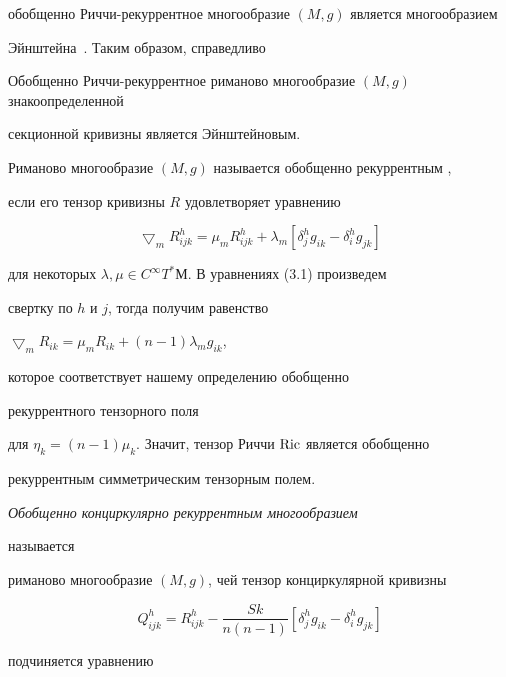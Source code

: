 обобщенно Риччи-рекуррентное многообразие $(M,g)$ является многообразием


Эйнштейна~\cite{tr5}. Таким образом, справедливо 





\begin{cor}


Обобщенно Риччи-рекуррентное риманово многообразие $(M,g)$ знакоопределенной


секционной кривизны является Эйнштейновым.


\end{cor}





Риманово многообразие $(M,g)$ называется обобщенно рекуррентным \cite{tr1},


если его тензор кривизны $R$ удовлетворяет уравнению


\begin{equation}


\bigtriangledown_m R^h_{ijk}=\mu_m R^h_{ijk}+


\lambda_m[\delta ^h_j g_{ik}-\delta^h_i g_{jk}]


\end{equation}


для некоторых $\lambda,\mu\in C^\infty T^* М$. В уравнениях (3.1) произведем


свертку по $h$ и $j$, тогда получим равенство


$\bigtriangledown_m R_{ik}=\mu_m R_{ik}+(n-1)\lambda_m g_{ik}$,


которое соответствует нашему определению обобщенно


рекуррентного тензорного поля


для $\eta_k=(n-1)\mu_k$. Значит, тензор Риччи $\operatorname{Ric}$ является обобщенно


рекуррентным симметрическим тензорным полем.





{\it Обобщенно конциркулярно рекуррентным многообразием}


называется \cite{tr1}


риманово многообразие $(M,g)$, чей тензор конциркулярной кривизны


$$


Q^h_{ijk}=R^h_{ijk}-\frac{Sk}{n(n-1)}[\delta^h_j g_{ik}-\delta^h_i g_{jk}] 


$$


подчиняется уравнению



